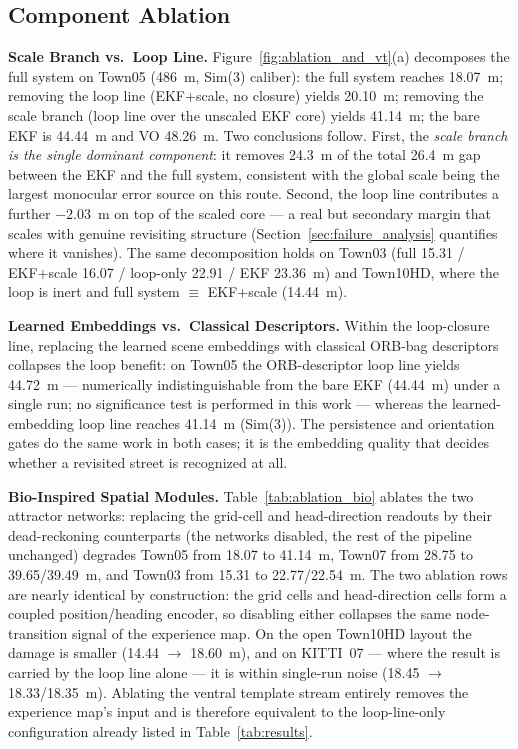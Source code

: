 \subsection{Component Ablation}
\label{sec:ablation}

\textbf{Scale Branch vs.\ Loop Line.} Figure~\ref{fig:ablation_and_vt}(a) decomposes the full system on Town05 (486~m, Sim(3) caliber): the full system reaches 18.07~m; removing the loop line (EKF+scale, no closure) yields 20.10~m; removing the scale branch (loop line over the unscaled EKF core) yields 41.14~m; the bare EKF is 44.44~m and VO 48.26~m. Two conclusions follow. First, the \emph{scale branch is the single dominant component}: it removes 24.3~m of the total 26.4~m gap between the EKF and the full system, consistent with the global scale being the largest monocular error source on this route. Second, the loop line contributes a further $-2.03$~m on top of the scaled core --- a real but secondary margin that scales with genuine revisiting structure (Section~\ref{sec:failure_analysis} quantifies where it vanishes). The same decomposition holds on Town03 (full 15.31 / EKF+scale 16.07 / loop-only 22.91 / EKF 23.36~m) and Town10HD, where the loop is inert and full system $\equiv$ EKF+scale (14.44~m).

\textbf{Learned Embeddings vs.\ Classical Descriptors.} Within the loop-closure line, replacing the learned scene embeddings with classical ORB-bag descriptors collapses the loop benefit: on Town05 the ORB-descriptor loop line yields 44.72~m --- numerically indistinguishable from the bare EKF (44.44~m) under a single run; no significance test is performed in this work --- whereas the learned-embedding loop line reaches 41.14~m (Sim(3)). The persistence and orientation gates do the same work in both cases; it is the embedding quality that decides whether a revisited street is recognized at all.

\textbf{Bio-Inspired Spatial Modules.} Table~\ref{tab:ablation_bio} ablates the two attractor networks: replacing the grid-cell and head-direction readouts by their dead-reckoning counterparts (the networks disabled, the rest of the pipeline unchanged) degrades Town05 from 18.07 to 41.14~m, Town07 from 28.75 to 39.65/39.49~m, and Town03 from 15.31 to 22.77/22.54~m. The two ablation rows are nearly identical by construction: the grid cells and head-direction cells form a coupled position/heading encoder, so disabling either collapses the same node-transition signal of the experience map. On the open Town10HD layout the damage is smaller (14.44 $\rightarrow$ 18.60~m), and on KITTI~07 --- where the result is carried by the loop line alone --- it is within single-run noise (18.45 $\rightarrow$ 18.33/18.35~m). Ablating the ventral template stream entirely removes the experience map's input and is therefore equivalent to the loop-line-only configuration already listed in Table~\ref{tab:results}.

